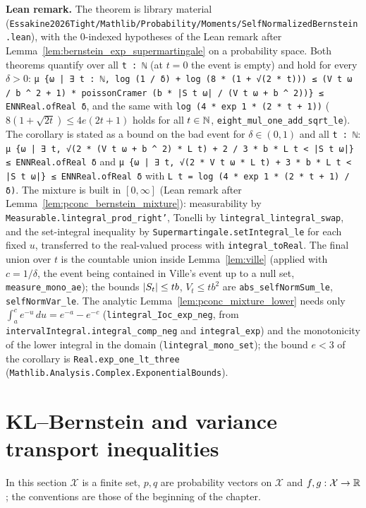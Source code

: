 \textbf{Lean remark.} The theorem is library material
(\texttt{Essakine2026Tight/Mathlib/Probability/Moments/SelfNormalizedBernstein.lean}), with the
$0$-indexed hypotheses of the Lean remark after Lemma~\ref{lem:bernstein_exp_supermartingale}
on a probability space. Both theorems quantify over all \texttt{t : ℕ} (at $t = 0$ the event is
empty) and hold for every $\delta > 0$:
\texttt{μ \{ω | ∃ t : ℕ, log (1 / δ) + log (8 * (1 + √(2 * t))) ≤ (V t ω / b \^{} 2 + 1) *
poissonCramer (b * |S t ω| / (V t ω + b \^{} 2))\} ≤ ENNReal.ofReal δ}, and the same with
\texttt{log (4 * exp 1 * (2 * t + 1))} ($8(1 + \sqrt{2t}) \le 4e(2t + 1)$ holds for all $t \in \mathbb{N}$,
\texttt{eight\_mul\_one\_add\_sqrt\_le}). The corollary is stated as a bound on the bad event for
$\delta \in (0, 1)$ and all \texttt{t : ℕ}:
\texttt{μ \{ω | ∃ t, √(2 * (V t ω + b \^{} 2) * L t) + 2 / 3 * b * L t < |S t ω|\} ≤ ENNReal.ofReal δ}
and \texttt{μ \{ω | ∃ t, √(2 * V t ω * L t) + 3 * b * L t < |S t ω|\} ≤ ENNReal.ofReal δ} with
\texttt{L t = log (4 * exp 1 * (2 * t + 1) / δ)}.
The mixture is built in $[0, \infty]$ (Lean remark after
Lemma~\ref{lem:pconc_bernstein_mixture}): measurability by \texttt{Measurable.lintegral\_prod\_right'},
Tonelli by \texttt{lintegral\_lintegral\_swap}, and the set-integral inequality by
\texttt{Supermartingale.setIntegral\_le} for each fixed $u$, transferred to the real-valued
process with \texttt{integral\_toReal}. The final union over $t$ is the countable union inside
Lemma~\ref{lem:ville} (applied with $c = 1/\delta$, the event being contained in Ville's event up to
a null set, \texttt{measure\_mono\_ae}); the bounds $\lvert S_t \rvert \le tb$, $V_t \le tb^2$ are
\texttt{abs\_selfNormSum\_le}, \texttt{selfNormVar\_le}. The analytic
Lemma~\ref{lem:pconc_mixture_lower} needs only $\int_a^{c} e^{-u}\,du = e^{-a} - e^{-c}$
(\texttt{lintegral\_Ioc\_exp\_neg}, from \texttt{intervalIntegral.integral\_comp\_neg} and
\texttt{integral\_exp}) and the monotonicity of the lower integral in the domain
(\texttt{lintegral\_mono\_set}); the bound $e < 3$ of the corollary is
\texttt{Real.exp\_one\_lt\_three} (\texttt{Mathlib.Analysis.Complex.ExponentialBounds}).

\section{KL--Bernstein and variance transport inequalities}
\label{sec:pconc_kl}

In this section $\mathcal X$ is a finite set, $p, q$ are probability vectors on $\mathcal X$ and
$f, g : \mathcal X \to \mathbb{R}$; the conventions are those of the beginning of the chapter.

